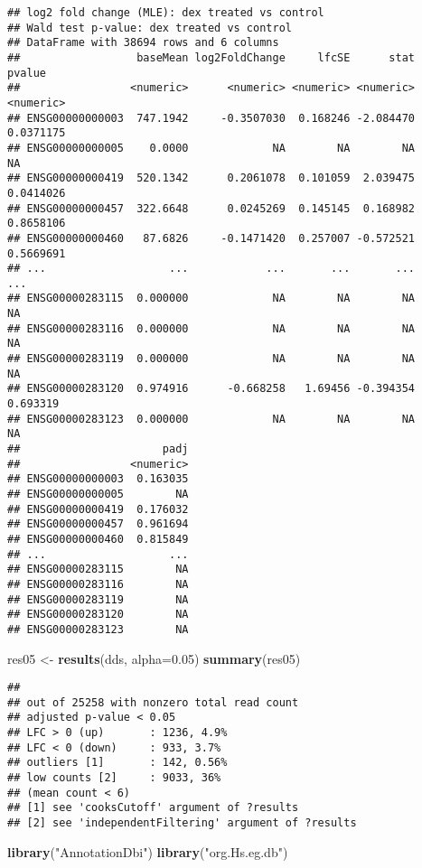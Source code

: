\documentclass[
]{article}
\newenvironment{Shaded}{\begin{snugshade}}{\end{snugshade}}
\newcommand{\AttributeTok}[1]{\textcolor[rgb]{0.13,0.29,0.53}{#1}}
\newcommand{\FloatTok}[1]{\textcolor[rgb]{0.00,0.00,0.81}{#1}}
\newcommand{\FunctionTok}[1]{\textcolor[rgb]{0.13,0.29,0.53}{\textbf{#1}}}
\newcommand{\NormalTok}[1]{#1}
\newcommand{\OtherTok}[1]{\textcolor[rgb]{0.56,0.35,0.01}{#1}}
\newcommand{\StringTok}[1]{\textcolor[rgb]{0.31,0.60,0.02}{#1}}
\begin{document}
\begin{verbatim}
## log2 fold change (MLE): dex treated vs control 
## Wald test p-value: dex treated vs control 
## DataFrame with 38694 rows and 6 columns
##                  baseMean log2FoldChange     lfcSE      stat    pvalue
##                 <numeric>      <numeric> <numeric> <numeric> <numeric>
## ENSG00000000003  747.1942     -0.3507030  0.168246 -2.084470 0.0371175
## ENSG00000000005    0.0000             NA        NA        NA        NA
## ENSG00000000419  520.1342      0.2061078  0.101059  2.039475 0.0414026
## ENSG00000000457  322.6648      0.0245269  0.145145  0.168982 0.8658106
## ENSG00000000460   87.6826     -0.1471420  0.257007 -0.572521 0.5669691
## ...                   ...            ...       ...       ...       ...
## ENSG00000283115  0.000000             NA        NA        NA        NA
## ENSG00000283116  0.000000             NA        NA        NA        NA
## ENSG00000283119  0.000000             NA        NA        NA        NA
## ENSG00000283120  0.974916      -0.668258   1.69456 -0.394354  0.693319
## ENSG00000283123  0.000000             NA        NA        NA        NA
##                      padj
##                 <numeric>
## ENSG00000000003  0.163035
## ENSG00000000005        NA
## ENSG00000000419  0.176032
## ENSG00000000457  0.961694
## ENSG00000000460  0.815849
## ...                   ...
## ENSG00000283115        NA
## ENSG00000283116        NA
## ENSG00000283119        NA
## ENSG00000283120        NA
## ENSG00000283123        NA
\end{verbatim}

\begin{Shaded}
\begin{Highlighting}[]
\NormalTok{res05 }\OtherTok{\textless{}{-}} \FunctionTok{results}\NormalTok{(dds, }\AttributeTok{alpha=}\FloatTok{0.05}\NormalTok{)}
\FunctionTok{summary}\NormalTok{(res05)}
\end{Highlighting}
\end{Shaded}

\begin{verbatim}
## 
## out of 25258 with nonzero total read count
## adjusted p-value < 0.05
## LFC > 0 (up)       : 1236, 4.9%
## LFC < 0 (down)     : 933, 3.7%
## outliers [1]       : 142, 0.56%
## low counts [2]     : 9033, 36%
## (mean count < 6)
## [1] see 'cooksCutoff' argument of ?results
## [2] see 'independentFiltering' argument of ?results
\end{verbatim}

\begin{Shaded}
\begin{Highlighting}[]
\FunctionTok{library}\NormalTok{(}\StringTok{"AnnotationDbi"}\NormalTok{)}
\FunctionTok{library}\NormalTok{(}\StringTok{"org.Hs.eg.db"}\NormalTok{)}
\end{Highlighting}
\end{Shaded}
\end{document}
